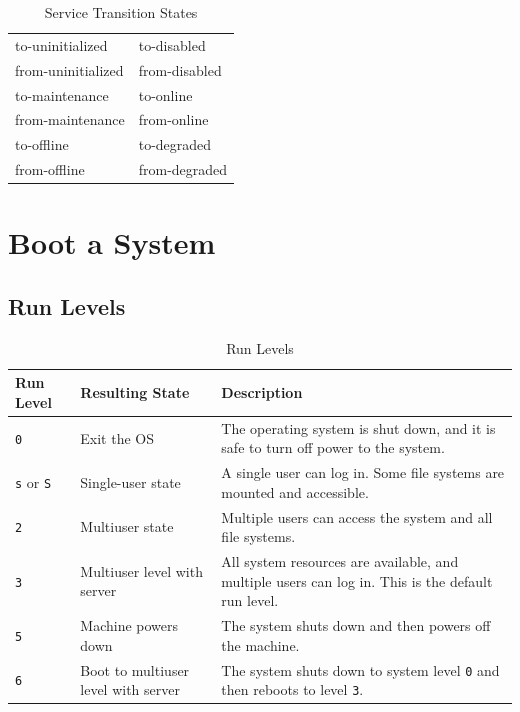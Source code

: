 \documentclass[10pt,a4paper,twoside]{report}
\begin{document}
\begin{table}[htbp]
\begin{tabular}{|p{}|p{}|}
\hline
\rowcolor{LightBlue}
\multicolumn{2}{|c|}{\textbf{Monitored Transition States}}\\
\hline
\rowcolor{LightYellow}
to-uninitialized & to-disabled\\
\hline
\rowcolor{LightYellow}
from-uninitialized & from-disabled\\
\hline
\rowcolor{LightYellow}
to-maintenance & to-online\\
\hline
\rowcolor{LightYellow}
from-maintenance & from-online\\
\hline
\rowcolor{LightYellow}
to-offline & to-degraded\\
\hline
\rowcolor{LightYellow}
from-offline & from-degraded\\
\hline
\end{tabular}
\caption{Service Transition States}
\end{table}
\section{Boot a System}
\subsection{Run Levels}

\begin{table}[htbp]
\begin{tabular}{|p{}|p{}|p{}|}
\hline
\rowcolor{LightBlue}
\textbf{Run Level} & \textbf{Resulting State} & \textbf{Description}\\
\hline
\rowcolor{LightYellow}
\verb+0+ & Exit the OS & The operating system is shut down, and it is safe to turn off power to the system.\\
\hline
\rowcolor{LightYellow}
\verb+s+ or \verb+S+ & Single-user state & A single user can log in. Some file systems are mounted and accessible.\\
\hline
\rowcolor{LightYellow}
\verb+2+ & Multiuser state & Multiple users can access the system and all file systems.\\
\hline
\rowcolor{LightYellow}
\verb+3+ & Multiuser level with server & All system resources are available, and multiple users can log in. This is the default run level.\\
\hline
\rowcolor{LightYellow}
\verb+5+ & Machine powers down & The system shuts down and then powers off the machine.\\
\hline
\rowcolor{LightYellow}
\verb+6+ & Boot to multiuser level with server & The system shuts down to system level \verb+0+ and then reboots to level \verb+3+.\\
\hline
\end{tabular}
\caption{Run Levels}
\end{table}
\end{document}
